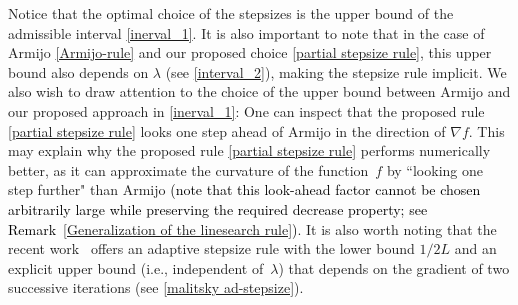 \documentclass[11pt, a4paper, oneside, reqno]{amsart}
\begin{document}
Notice that the optimal choice of the stepsizes is the upper bound of the admissible interval \eqref{inerval_1}. It is also important to note that in the case of Armijo \eqref{Armijo-rule} and our proposed choice \eqref{partial stepsize rule}, this upper bound also depends on $\lambda$ (see \eqref{interval_2}), making the stepsize rule implicit. We also wish to draw attention to the choice of the upper bound between Armijo and our proposed approach in \eqref{inerval_1}: One can inspect that the proposed rule \eqref{partial stepsize rule} looks one step ahead of Armijo in the direction of $\nabla f$. This may explain why the proposed rule \eqref{partial stepsize rule} performs numerically better, as it can approximate the curvature of the function~$f$ by ``looking one step further" than Armijo \textcolor{black}{(note that this look-ahead factor cannot be chosen arbitrarily large while preserving the required decrease property; see Remark~\ref{Generalization of the linesearch rule})}. It is also worth noting that the recent work~\cite{Malitsky2020} offers an adaptive stepsize rule with the lower bound $1/2L$ and an explicit upper bound (i.e., independent of~$\lambda$) that depends on the gradient of two successive iterations (see \eqref{malitsky ad-stepsize}).
\end{document}
